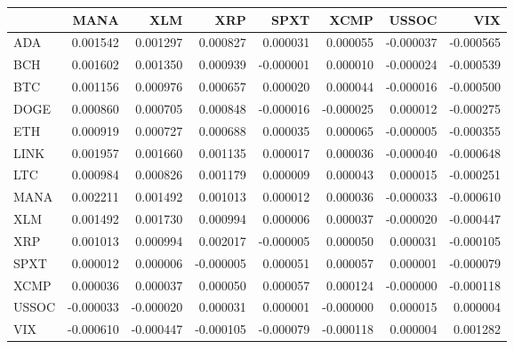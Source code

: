 \begin{tabular}{lrrrrrrr}
\toprule
 & MANA & XLM & XRP & SPXT & XCMP & USSOC & VIX \\
\midrule
ADA & 0.001542 & 0.001297 & 0.000827 & 0.000031 & 0.000055 & -0.000037 & -0.000565 \\
BCH & 0.001602 & 0.001350 & 0.000939 & -0.000001 & 0.000010 & -0.000024 & -0.000539 \\
BTC & 0.001156 & 0.000976 & 0.000657 & 0.000020 & 0.000044 & -0.000016 & -0.000500 \\
DOGE & 0.000860 & 0.000705 & 0.000848 & -0.000016 & -0.000025 & 0.000012 & -0.000275 \\
ETH & 0.000919 & 0.000727 & 0.000688 & 0.000035 & 0.000065 & -0.000005 & -0.000355 \\
LINK & 0.001957 & 0.001660 & 0.001135 & 0.000017 & 0.000036 & -0.000040 & -0.000648 \\
LTC & 0.000984 & 0.000826 & 0.001179 & 0.000009 & 0.000043 & 0.000015 & -0.000251 \\
MANA & 0.002211 & 0.001492 & 0.001013 & 0.000012 & 0.000036 & -0.000033 & -0.000610 \\
XLM & 0.001492 & 0.001730 & 0.000994 & 0.000006 & 0.000037 & -0.000020 & -0.000447 \\
XRP & 0.001013 & 0.000994 & 0.002017 & -0.000005 & 0.000050 & 0.000031 & -0.000105 \\
SPXT & 0.000012 & 0.000006 & -0.000005 & 0.000051 & 0.000057 & 0.000001 & -0.000079 \\
XCMP & 0.000036 & 0.000037 & 0.000050 & 0.000057 & 0.000124 & -0.000000 & -0.000118 \\
USSOC & -0.000033 & -0.000020 & 0.000031 & 0.000001 & -0.000000 & 0.000015 & 0.000004 \\
VIX & -0.000610 & -0.000447 & -0.000105 & -0.000079 & -0.000118 & 0.000004 & 0.001282 \\
\bottomrule
\end{tabular}
